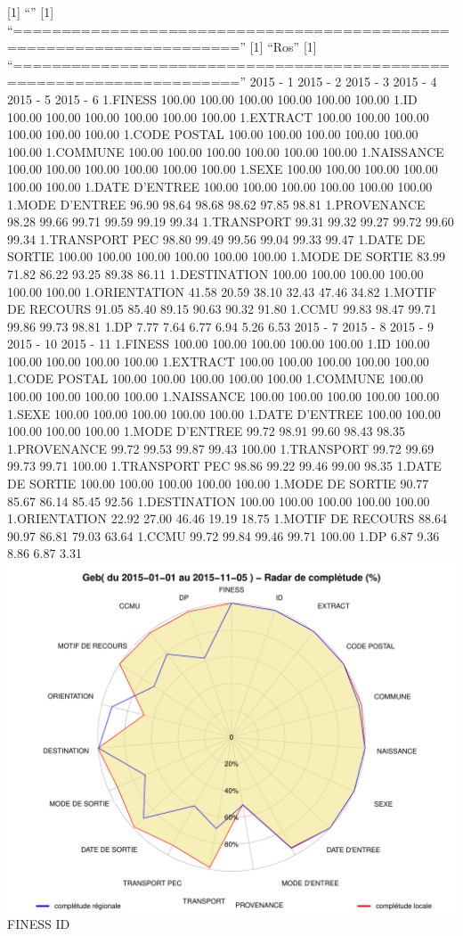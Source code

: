 \documentclass[]{article}
\begin{document}
{[}1{]} ``'' {[}1{]}
``=====================================================================''
{[}1{]} ``Ros'' {[}1{]}
``=====================================================================''
2015 - 1 2015 - 2 2015 - 3 2015 - 4 2015 - 5 2015 - 6 1.FINESS 100.00
100.00 100.00 100.00 100.00 100.00 1.ID 100.00 100.00 100.00 100.00
100.00 100.00 1.EXTRACT 100.00 100.00 100.00 100.00 100.00 100.00 1.CODE
POSTAL 100.00 100.00 100.00 100.00 100.00 100.00 1.COMMUNE 100.00 100.00
100.00 100.00 100.00 100.00 1.NAISSANCE 100.00 100.00 100.00 100.00
100.00 100.00 1.SEXE 100.00 100.00 100.00 100.00 100.00 100.00 1.DATE
D'ENTREE 100.00 100.00 100.00 100.00 100.00 100.00 1.MODE D'ENTREE 96.90
98.64 98.68 98.62 97.85 98.81 1.PROVENANCE 98.28 99.66 99.71 99.59 99.19
99.34 1.TRANSPORT 99.31 99.32 99.27 99.72 99.60 99.34 1.TRANSPORT PEC
98.80 99.49 99.56 99.04 99.33 99.47 1.DATE DE SORTIE 100.00 100.00
100.00 100.00 100.00 100.00 1.MODE DE SORTIE 83.99 71.82 86.22 93.25
89.38 86.11 1.DESTINATION 100.00 100.00 100.00 100.00 100.00 100.00
1.ORIENTATION 41.58 20.59 38.10 32.43 47.46 34.82 1.MOTIF DE RECOURS
91.05 85.40 89.15 90.63 90.32 91.80 1.CCMU 99.83 98.47 99.71 99.86 99.73
98.81 1.DP 7.77 7.64 6.77 6.94 5.26 6.53 2015 - 7 2015 - 8 2015 - 9 2015
- 10 2015 - 11 1.FINESS 100.00 100.00 100.00 100.00 100.00 1.ID 100.00
100.00 100.00 100.00 100.00 1.EXTRACT 100.00 100.00 100.00 100.00 100.00
1.CODE POSTAL 100.00 100.00 100.00 100.00 100.00 1.COMMUNE 100.00 100.00
100.00 100.00 100.00 1.NAISSANCE 100.00 100.00 100.00 100.00 100.00
1.SEXE 100.00 100.00 100.00 100.00 100.00 1.DATE D'ENTREE 100.00 100.00
100.00 100.00 100.00 1.MODE D'ENTREE 99.72 98.91 99.60 98.43 98.35
1.PROVENANCE 99.72 99.53 99.87 99.43 100.00 1.TRANSPORT 99.72 99.69
99.73 99.71 100.00 1.TRANSPORT PEC 98.86 99.22 99.46 99.00 98.35 1.DATE
DE SORTIE 100.00 100.00 100.00 100.00 100.00 1.MODE DE SORTIE 90.77
85.67 86.14 85.45 92.56 1.DESTINATION 100.00 100.00 100.00 100.00 100.00
1.ORIENTATION 22.92 27.00 46.46 19.19 18.75 1.MOTIF DE RECOURS 88.64
90.97 86.81 79.03 63.64 1.CCMU 99.72 99.84 99.46 99.71 100.00 1.DP 6.87
9.36 8.86 6.87 3.31
\includegraphics{completude_files/figure-latex/finess-11.pdf} FINESS ID
\end{document}
